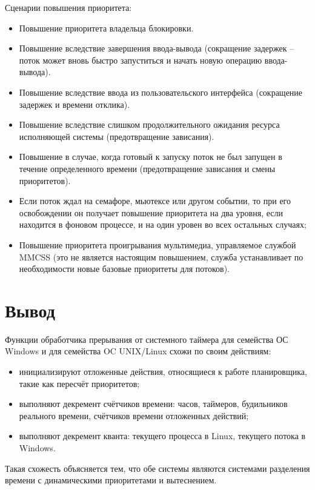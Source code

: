 Сценарии повышения приоритета:
\begin{itemize}
	\item Повышение приоритета владельца блокировки.
	\item Повышение вследствие завершения ввода-вывода (сокращение задержек -- поток может вновь быстро запуститься и начать новую операцию ввода-вывода).
	\item Повышение вследствие ввода из пользовательского интерфейса (сокращение задержек и времени отклика).
	\item Повышение вследствие слишком продолжительного ожидания ресурса исполняющей системы (предотвращение зависания).
	\item Повышение в случае, когда готовый к запуску поток не был запущен в течение определенного времени (предотвращение зависания и смены приоритетов).
	\item Если поток ждал на семафоре, мьютексе или другом событии, то 	при его освобождении он получает повышение приоритета на два 	уровня, если находится в фоновом процессе, и на один уровен	во всех остальных случаях;
	\item Повышение приоритета проигрывания мультимедиа, управляемое службой MMCSS (это не является настоящим повышением, служба устанавливает по необходимости новые базовые приоритеты для потоков).
\end{itemize}


\chapter*{Вывод}

Функции обработчика прерывания от системного таймера для семейства ОС {\ttfamily Windows} и для семейства OC {\ttfamily UNIX/Linux} схожи по своим действиям:
\begin{itemize}
	\item инициализируют отложенные действия, относящиеся к работе планировщика, такие как пересчёт приоритетов;
	\item выполняют декремент счётчиков времени: часов, таймеров, будильников реального времени, счётчиков времени отложенных действий;
	\item выполняют декремент кванта: текущего процесса в {\ttfamily Linux}, текущего потока в {\ttfamily Windows}.
\end{itemize}

Такая схожесть объясняется тем, что обе системы являются системами разделения времени с динамическими приоритетами и вытеснением.

